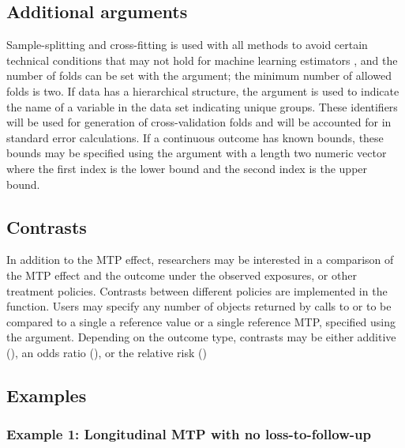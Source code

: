 \documentclass[]{jss}
\begin{document}
\hypertarget{additional-arguments}{%
\subsection{Additional arguments}\label{additional-arguments}}

Sample-splitting and cross-fitting is used with all methods to avoid
certain technical conditions that may not hold for machine learning
estimators \citep{zhengCrossValidatedTargetedMinimumLossBased2011b,
  chernozhukovDoubleDebiasedMachine2018}, and the number of folds can
be set with the  argument; the minimum number of allowed
folds is two.  If data has a hierarchical structure, the 
argument is used to indicate the name of a variable in the data set
indicating unique groups. These identifiers will be used for
generation of cross-validation folds and will be accounted for in
standard error calculations. If a continuous outcome has known bounds,
these bounds may be specified using the  argument with a
length two numeric vector where the first index is the lower bound and
the second index is the upper bound.

\hypertarget{contrasts}{%
\subsection{Contrasts}\label{contrasts}}

In addition to the MTP effect, researchers may be interested in a
comparison of the MTP effect and the outcome under the observed
exposures, or other treatment policies. Contrasts between different
policies are implemented in the  function. Users
may specify any number of objects returned by calls to
 or  to be compared to a single a
reference value or a single reference MTP, specified using the
 argument.  Depending on the outcome type, contrasts may be
either additive (), an odds ratio (), or the relative risk ()

\hypertarget{examples}{%
\subsection{Examples}\label{examples}}

\hypertarget{example-1-longitudinal-mtp-with-no-loss-to-follow-up}{%
\subsubsection{Example 1: Longitudinal MTP with no
loss-to-follow-up}\label{example-1-longitudinal-mtp-with-no-loss-to-follow-up}}
\end{document}
